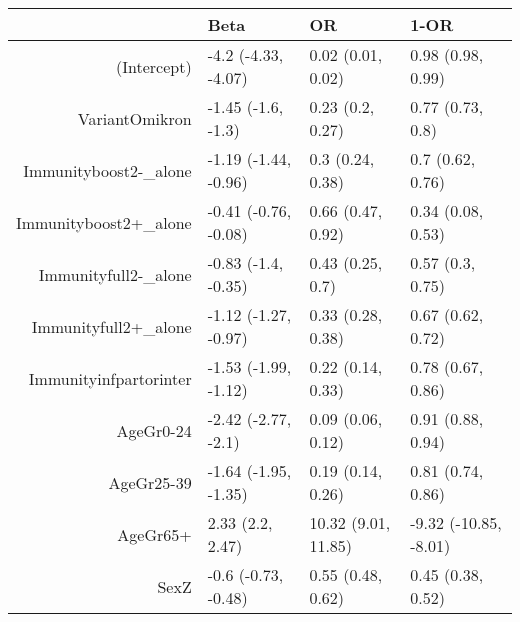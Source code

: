 \begin{table}[ht]
\centering
\begin{tabular}{rlll}
  \hline
 & Beta & OR & 1-OR \\ 
  \hline
(Intercept) & -4.2 (-4.33, -4.07) & 0.02 (0.01, 0.02) & 0.98 (0.98, 0.99) \\ 
  VariantOmikron & -1.45 (-1.6, -1.3) & 0.23 (0.2, 0.27) & 0.77 (0.73, 0.8) \\ 
  Immunityboost2-\_alone & -1.19 (-1.44, -0.96) & 0.3 (0.24, 0.38) & 0.7 (0.62, 0.76) \\ 
  Immunityboost2+\_alone & -0.41 (-0.76, -0.08) & 0.66 (0.47, 0.92) & 0.34 (0.08, 0.53) \\ 
  Immunityfull2-\_alone & -0.83 (-1.4, -0.35) & 0.43 (0.25, 0.7) & 0.57 (0.3, 0.75) \\ 
  Immunityfull2+\_alone & -1.12 (-1.27, -0.97) & 0.33 (0.28, 0.38) & 0.67 (0.62, 0.72) \\ 
  Immunityinfpartorinter & -1.53 (-1.99, -1.12) & 0.22 (0.14, 0.33) & 0.78 (0.67, 0.86) \\ 
  AgeGr0-24 & -2.42 (-2.77, -2.1) & 0.09 (0.06, 0.12) & 0.91 (0.88, 0.94) \\ 
  AgeGr25-39 & -1.64 (-1.95, -1.35) & 0.19 (0.14, 0.26) & 0.81 (0.74, 0.86) \\ 
  AgeGr65+ & 2.33 (2.2, 2.47) & 10.32 (9.01, 11.85) & -9.32 (-10.85, -8.01) \\ 
  SexZ & -0.6 (-0.73, -0.48) & 0.55 (0.48, 0.62) & 0.45 (0.38, 0.52) \\ 
   \hline
\end{tabular}
\end{table}
